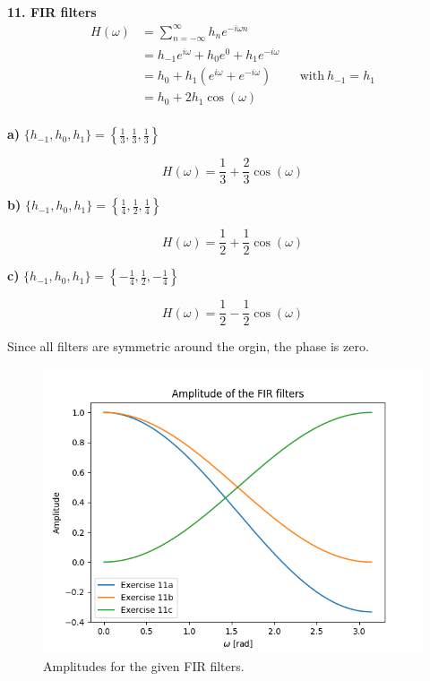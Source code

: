 \newpage 
\textbf{\large 11. FIR filters}
\\

\begin{align}
	H(\omega) &= \sum_{n=-\infty}^\infty h_n e^{-i \omega n} \\
	&= h_{-1} e^{i \omega} + h_0 e^{0} + h_1 e^{-i \omega} \\
	&= h_0 + h_1 \left( e^{i \omega} + e^{-i \omega} \right) & & \text{with}\ h_{-1} = h_1 \\
	&= h_0 + 2 h_1 \cos(\omega) \\
\end{align}


\textbf{a)} $\{h_{-1}, h_0, h_1\} = \left\{\frac{1}{3}, \frac{1}{3}, \frac{1}{3}\right\}$

\begin{equation*}
	H(\omega) = \frac{1}{3} + \frac{2}{3} \cos(\omega)
\end{equation*}

\textbf{b)} $\{h_{-1}, h_0, h_1\} = \left\{\frac{1}{4}, \frac{1}{2}, \frac{1}{4}\right\}$

\begin{equation*}
	H(\omega) = \frac{1}{2} + \frac{1}{2} \cos(\omega)
\end{equation*}

\textbf{c)} $\{h_{-1}, h_0, h_1\} = \left\{-\frac{1}{4}, \frac{1}{2}, -\frac{1}{4}\right\}$

\begin{equation*}
	H(\omega) = \frac{1}{2} - \frac{1}{2} \cos(\omega)
\end{equation*}

\vspace{1cm}
Since all filters are symmetric around the orgin, the phase is zero.

\begin{figure}[h]
	\centering
	\includegraphics[width=12cm]{img/ex_11.png}
	\captionsetup{width=10cm}
	\caption{Amplitudes for the given FIR filters.}
\end{figure}

